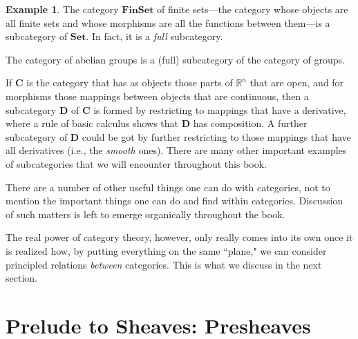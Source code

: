 \documentclass[a4paper]{book}
\theoremstyle{definition}
\newtheorem{example}{Example}[section]
\theoremstyle{definition}
\theoremstyle{definition}
\theoremstyle{theorem}
\theoremstyle{definition}
\begin{document}
\begin{example}
	The category $\textbf{FinSet}$ of finite sets---the category whose objects are all finite sets and whose morphisms are all the functions between them---is a subcategory of $\textbf{Set}$. In fact, it is a \textit{full} subcategory. \par 
	The category of abelian groups is a (full) subcategory of the category of groups. \par 
	If $\textbf{C}$ is the category that has as objects those parts of $\mathbb{R}^n$ that are open, and for morphisms those mappings between objects that are continuous, then a subcategory $\textbf{D}$ of $\textbf{C}$ is formed by restricting to mappings that have a derivative, where a rule of basic calculus shows that $\textbf{D}$ has composition. A further subcategory of $\textbf{D}$ could be got by further restricting to those mappings that have all derivatives (i.e., the \textit{smooth} ones). There are many other important examples of subcategories that we will encounter throughout this book. 
\end{example}
There are a number of other useful things one can do with categories, not to mention the important things one can do and find within categories. Discussion of such matters is left to emerge organically throughout the book. \par 
	The real power of category theory, however, only really comes into its own once it is realized how, by putting everything on the same ``plane," we can consider principled relations \textit{between} categories. This is what we discuss in the next section. 
	\section{Prelude to Sheaves: Presheaves} 
\end{document}
